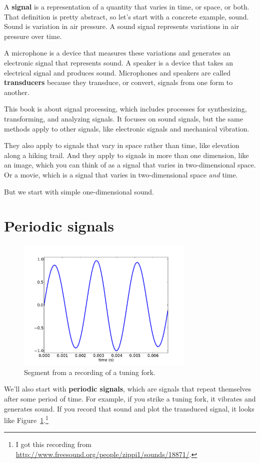 \documentclass[12pt]{book}
\begin{document}
A {\bf signal} is a representation of a quantity that varies in time,
or space, or both.  That definition is pretty abstract, so let's start
with a concrete example, sound.  Sound is variation in air pressure.
A sound signal represents variations in air pressure over time.

A microphone is a device that measures these variations and generates
an electronic signal that represents sound.  A speaker is a device
that takes an electrical signal and produces sound.
Microphones and speakers are called {\bf transducers} because they
transduce, or convert, signals from one form to another.

This book is about signal processing, which includes processes for
synthesizing, transforming, and analyzing signals.  It focuses on
sound signals, but the same methods apply to other signals, like
electronic signals and mechanical vibration.

They also apply to signals that vary in space rather than time, like
elevation along a hiking trail.  And they apply to signals in more
than one dimension, like an image, which you can think of as a signal
that varies in two-dimensional space.  Or a movie, which is
a signal that varies in two-dimensional space {\it and} time.

But we start with simple one-dimensional sound.


\section{Periodic signals}

\begin{figure}
\centerline{\includegraphics[height=2.5in]{figs/tuning1.pdf}}
\caption{Segment from a recording of a tuning fork.}
\label{fig.tuning1}
\end{figure}

We'll also start with {\bf periodic signals}, which are signals that
repeat themselves after some period of time.  For example, if you
strike a tuning fork, it vibrates and generates sound.  If you record
that sound and plot the transduced signal, it looks like
Figure~\ref{fig.tuning1}.\footnote{I got this recording from
  \url{http://www.freesound.org/people/zippi1/sounds/18871/}.}
\end{document}

